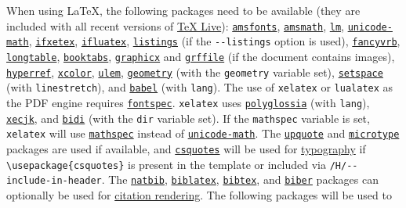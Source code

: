 \documentclass[
  12pt,
  a4paper,
]{article}
\begin{document}
When using LaTeX, the following packages need to be available (they are included with all recent
versions of \href{http://www.tug.org/texlive/}{TeX Live}):
\href{https://ctan.org/pkg/amsfonts}{\texttt{amsfonts}},
\href{https://ctan.org/pkg/amsmath}{\texttt{amsmath}},
\href{https://ctan.org/pkg/lm}{\texttt{lm}},
\href{https://ctan.org/pkg/unicode-math}{\texttt{unicode-math}},
\href{https://ctan.org/pkg/ifxetex}{\texttt{ifxetex}},
\href{https://ctan.org/pkg/ifluatex}{\texttt{ifluatex}},
\href{https://ctan.org/pkg/listings}{\texttt{listings}} (if the \texttt{-\/-listings} option is
used), \href{https://ctan.org/pkg/fancyvrb}{\texttt{fancyvrb}},
\href{https://ctan.org/pkg/longtable}{\texttt{longtable}},
\href{https://ctan.org/pkg/booktabs}{\texttt{booktabs}},
\href{https://ctan.org/pkg/graphicx}{\texttt{graphicx}} and
\href{https://ctan.org/pkg/grffile}{\texttt{grffile}} (if the document contains images),
\href{https://ctan.org/pkg/hyperref}{\texttt{hyperref}},
\href{https://ctan.org/pkg/xcolor}{\texttt{xcolor}},
\href{https://ctan.org/pkg/ulem}{\texttt{ulem}},
\href{https://ctan.org/pkg/geometry}{\texttt{geometry}} (with the \texttt{geometry} variable set),
\href{https://ctan.org/pkg/setspace}{\texttt{setspace}} (with \texttt{linestretch}), and
\href{https://ctan.org/pkg/babel}{\texttt{babel}} (with \texttt{lang}). The use of
\texttt{xelatex} or \texttt{lualatex} as the PDF engine requires
\href{https://ctan.org/pkg/fontspec}{\texttt{fontspec}}. \texttt{xelatex} uses
\href{https://ctan.org/pkg/polyglossia}{\texttt{polyglossia}} (with \texttt{lang}),
\href{https://ctan.org/pkg/xecjk}{\texttt{xecjk}}, and
\href{https://ctan.org/pkg/bidi}{\texttt{bidi}} (with the \texttt{dir} variable set). If the
\texttt{mathspec} variable is set, \texttt{xelatex} will use
\href{https://ctan.org/pkg/mathspec}{\texttt{mathspec}} instead of
\href{https://ctan.org/pkg/unicode-math}{\texttt{unicode-math}}. The
\href{https://ctan.org/pkg/upquote}{\texttt{upquote}} and
\href{https://ctan.org/pkg/microtype}{\texttt{microtype}} packages are used if available, and
\href{https://ctan.org/pkg/csquotes}{\texttt{csquotes}} will be used for
\protect\hyperlink{typography}{typography} if \texttt{\textbackslash{}usepackage\{csquotes\}} is
present in the template or included via \texttt{/H/-\/-include-in-header}. The
\href{https://ctan.org/pkg/natbib}{\texttt{natbib}},
\href{https://ctan.org/pkg/biblatex}{\texttt{biblatex}},
\href{https://ctan.org/pkg/bibtex}{\texttt{bibtex}}, and
\href{https://ctan.org/pkg/biber}{\texttt{biber}} packages can optionally be used for
\protect\hyperlink{citation-rendering}{citation rendering}. The following packages will be used to
\end{document}
